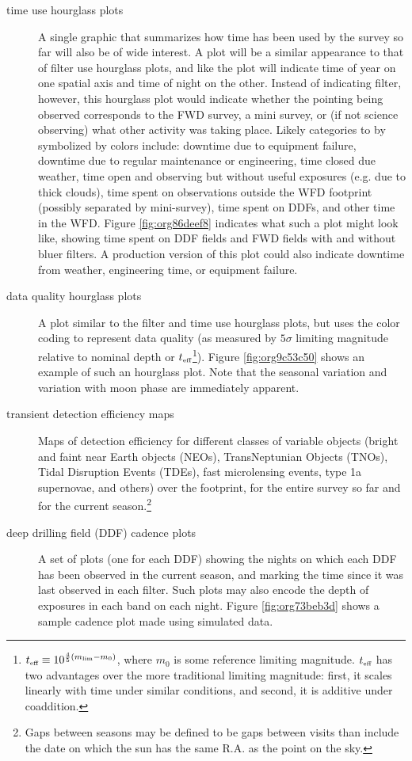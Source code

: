 \begin{description}
\item[{time use hourglass plots}] A single graphic that summarizes how time has been used by the survey so far will also be of wide interest. A plot will be a similar appearance to that of filter use hourglass plots, and like the plot will indicate time of year on one spatial axis and time of night on the other. Instead of indicating filter, however, this hourglass plot would indicate whether the pointing being observed corresponds to the FWD survey, a mini survey, or (if not science observing) what other activity was taking place. Likely categories to by symbolized by colors include: downtime due to equipment failure, downtime due to regular maintenance or engineering, time closed due weather, time open and observing but without useful exposures (e.g. due to thick clouds), time spent on observations outside the WFD footprint (possibly separated by mini-survey), time spent on DDFs, and other time in the WFD. Figure \ref{fig:org86deef8} indicates what such a plot might look like, showing time spent on DDF fields and FWD fields with and without bluer filters. A production version of this plot could also indicate downtime from weather, engineering time, or equipment failure.
\item[{data quality hourglass plots}] A plot similar to the filter and time use hourglass plots, but uses the color coding to represent data quality (as measured by \(5\sigma\) limiting magnitude relative to nominal depth or \(t_{\mbox{\tiny eff}}\)\footnote{\(t_{\mbox{\tiny eff}} \equiv 10^{\frac{4}{5}(m_{\mbox{\tiny lim}} - m_{0})}\), where \(m_{0}\) is some reference limiting magnitude. \(t_{\mbox{\tiny eff}}\) has two advantages over the more traditional limiting magnitude: first, it scales linearly with time under similar conditions, and second, it is additive under coaddition.}). Figure \ref{fig:org9c53c50} shows an example of such an hourglass plot. Note that the seasonal variation and variation with moon phase are immediately apparent.
\item[{transient detection efficiency maps}] Maps of detection efficiency for different classes of variable objects (bright and faint near Earth objects (NEOs), TransNeptunian Objects (TNOs), Tidal Disruption Events (TDEs), fast microlensing events, type 1a supernovae, and others) over the footprint, for the entire survey so far and for the current season.\footnote{Gaps between seasons may be defined to be gaps between visits than include the date on which the sun has the same R.A. as the point on the sky.}
\item[{deep drilling field (DDF) cadence plots}] A set of plots (one for each DDF) showing the nights on which each DDF has been observed in the current season, and marking the time since it was last observed in each filter. Such plots may also encode the depth of exposures in each band on each night. Figure \ref{fig:org73beb3d} shows a sample cadence plot made using simulated data.

\end{description}
